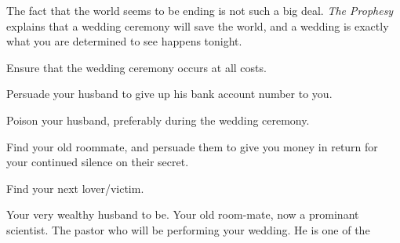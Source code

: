 \documentclass[char]{guildcamp1}
\begin{document}
The fact that the world seems to be ending is not such a big deal. {\em The Prophesy} explains that a wedding ceremony will save the world, and a wedding is exactly what you are determined to see happens tonight.

\begin{itemz}[Goals]
  \item Ensure that the wedding ceremony occurs at all costs.
  \item Persuade your husband to give up his bank account number to you.
  \item Poison your husband, preferably during the wedding ceremony.
  \item Find your old roommate, \cRival{} and persuade them to give you money in return for your continued silence on their secret.
  \item Find your next lover/victim.
\end{itemz}

\begin{contacts}
  \contact{\cGroomA{}} Your very wealthy husband to be. 
  \contact{\cRival{}} Your old room-mate, now a prominant scientist.
  \contact{\cPastor{}} The pastor who will be performing your wedding. He is one of the 
\end{contacts}
\end{document}
